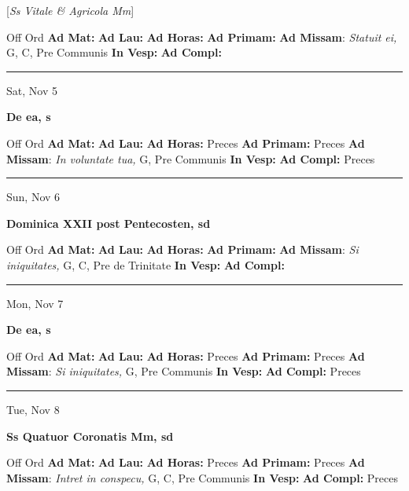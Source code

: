 \documentclass[letterpaper, 10pt]{article}
\begin{document}
[\textit{Ss Vitale \& Agricola Mm}]
\begin{justify}
Off Ord
\textbf{Ad Mat: }
\textbf{Ad Lau: }
\textbf{Ad Horas: }
\textbf{Ad Primam: }
\textbf{Ad Missam}: \textit{Statuit ei,} G, C, Pre Communis
\textbf{In Vesp: }
\textbf{Ad Compl: }\end{justify}



\hrule
\begin{center}
Sat, Nov 5
\end{center}\textbf{ \large De ea, \textnormal{\normalsize s}}
\begin{justify}
Off Ord
\textbf{Ad Mat: }
\textbf{Ad Lau: }
\textbf{Ad Horas: }Preces
\textbf{Ad Primam: }Preces
\textbf{Ad Missam}: \textit{In voluntate tua,} G, Pre Communis
\textbf{In Vesp: }
\textbf{Ad Compl: }Preces\end{justify}



\hrule
\begin{center}
Sun, Nov 6
\end{center}\textbf{ \large Dominica XXII post Pentecosten, \textnormal{\normalsize sd}}
\begin{justify}
Off Ord
\textbf{Ad Mat: }
\textbf{Ad Lau: }
\textbf{Ad Horas: }
\textbf{Ad Primam: }
\textbf{Ad Missam}: \textit{Si iniquitates,} G, C, Pre de Trinitate
\textbf{In Vesp: }
\textbf{Ad Compl: }\end{justify}



\hrule
\begin{center}
Mon, Nov 7
\end{center}\textbf{ \large De ea, \textnormal{\normalsize s}}
\begin{justify}
Off Ord
\textbf{Ad Mat: }
\textbf{Ad Lau: }
\textbf{Ad Horas: }Preces
\textbf{Ad Primam: }Preces
\textbf{Ad Missam}: \textit{Si iniquitates,} G, Pre Communis
\textbf{In Vesp: }
\textbf{Ad Compl: }Preces\end{justify}



\hrule
\begin{center}
Tue, Nov 8
\end{center}\textbf{ \large Ss Quatuor Coronatis Mm, \textnormal{\normalsize sd}}
\begin{justify}
Off Ord
\textbf{Ad Mat: }
\textbf{Ad Lau: }
\textbf{Ad Horas: }Preces
\textbf{Ad Primam: }Preces
\textbf{Ad Missam}: \textit{Intret in conspecu,} G, C, Pre Communis
\textbf{In Vesp: }
\textbf{Ad Compl: }Preces\end{justify}
\end{document}
